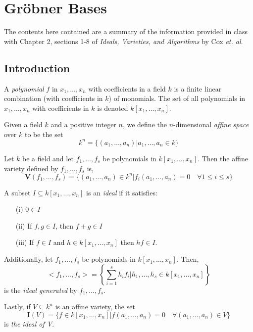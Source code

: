 \section{Gr\"obner Bases}

The contents here contained are a summary of the information provided in class with Chapter 2, sections 1-8 of \textit{Ideals, Varieties, and Algorithms} by Cox \textit{et. al}.

\subsection{Introduction}

\begin{definition}[Polynomial]
    A \textit{polynomial} $f$ in $x_1, \dots, x_n$ with coefficients in a field $k$ is a finite linear combination (with coefficients in $k$) of monomials.
    The set of all polynomials in $x_1, \dots, x_n$ with coefficients in $k$ is denoted $k[x_1, \dots, x_n]$.
\end{definition}

\begin{definition}
    Given a field $k$ and a positive integer $n$, we define the $n$-dimensional \textit{affine space} over $k$ to be the set
    $$k^n = \{ (a_1, \dots, a_n) | a_1, \dots, a_n \in k \}$$
\end{definition}

\begin{definition}
    Let $k$ be a field and let $f_1, \dots, f_s$ be polynomials in $k[x_1, \dots, x_n]$.
    Then the affine variety defined by $f_1, \dots, f_s$ is,
    $$\pmb{V}(f_1, \dots, f_s) = \{ (a_1, \dots, a_n) \in k^n | f_i(a_1, \dots, a_n) = 0 \quad \forall 1 \leq i \leq s \}$$
\end{definition}

\begin{definition}[Ideals]
    A subset $I \subseteq k[x_1, \dots, x_n]$ is an \textit{ideal} if it satisfies:
    \begin{enumerate}
        \item[(i)] $0 \in I$
        \item[(ii)] If $f, g \in I$, then $f + g \in I$
        \item[(iii)] If $f \in I$ and $h \in k[x_1, \dots, x_n]$ then $hf \in I$.
    \end{enumerate}
    Additionally, let $f_1, \dots, f_s$ be polynomials in $k[x_1, \dots, x_n]$.
    Then,
    $$<f_1, \dots, f_s> = \left\{ \sum_{i=1}^s h_i f_i | h_1, \dots, h_s \in k[x_1, \dots, x_n] \right\}$$
    is the \textit{ideal generated} by $f_1, \dots, f_s$.

    Lastly, if $V \subseteq k^n$ is an affine variety, the set
    $$\pmb{I}(V) = \{f \in k[x_1, \dots, x_n] | f(a_1, \dots, a_n) = 0 \quad \forall (a_1, \dots, a_n) \in V\}$$
    is \textit{the ideal of V}.
\end{definition}

